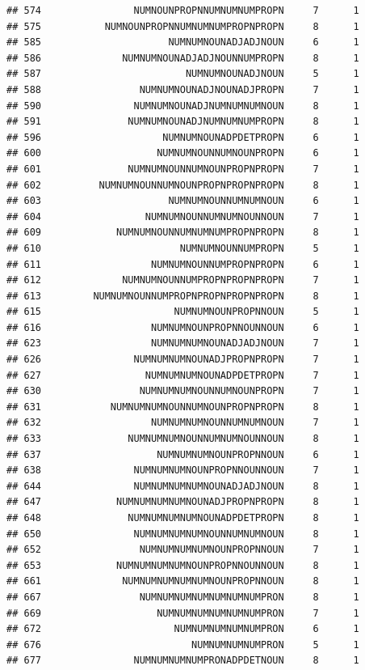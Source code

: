 \documentclass[]{article}
\begin{document}
\begin{verbatim}
## 574                NUMNOUNPROPNNUMNUMNUMPROPN     7      1
## 575           NUMNOUNPROPNNUMNUMNUMPROPNPROPN     8      1
## 585                      NUMNUMNOUNADJADJNOUN     6      1
## 586              NUMNUMNOUNADJADJNOUNNUMPROPN     8      1
## 587                         NUMNUMNOUNADJNOUN     5      1
## 588                 NUMNUMNOUNADJNOUNADJPROPN     7      1
## 590                NUMNUMNOUNADJNUMNUMNUMNOUN     8      1
## 591               NUMNUMNOUNADJNUMNUMNUMPROPN     8      1
## 596                     NUMNUMNOUNADPDETPROPN     6      1
## 600                    NUMNUMNOUNNUMNOUNPROPN     6      1
## 601               NUMNUMNOUNNUMNOUNPROPNPROPN     7      1
## 602          NUMNUMNOUNNUMNOUNPROPNPROPNPROPN     8      1
## 603                      NUMNUMNOUNNUMNUMNOUN     6      1
## 604                  NUMNUMNOUNNUMNUMNOUNNOUN     7      1
## 609             NUMNUMNOUNNUMNUMNUMPROPNPROPN     8      1
## 610                        NUMNUMNOUNNUMPROPN     5      1
## 611                   NUMNUMNOUNNUMPROPNPROPN     6      1
## 612              NUMNUMNOUNNUMPROPNPROPNPROPN     7      1
## 613         NUMNUMNOUNNUMPROPNPROPNPROPNPROPN     8      1
## 615                       NUMNUMNOUNPROPNNOUN     5      1
## 616                   NUMNUMNOUNPROPNNOUNNOUN     6      1
## 623                   NUMNUMNUMNOUNADJADJNOUN     7      1
## 626                NUMNUMNUMNOUNADJPROPNPROPN     7      1
## 627                  NUMNUMNUMNOUNADPDETPROPN     7      1
## 630                 NUMNUMNUMNOUNNUMNOUNPROPN     7      1
## 631            NUMNUMNUMNOUNNUMNOUNPROPNPROPN     8      1
## 632                   NUMNUMNUMNOUNNUMNUMNOUN     7      1
## 633               NUMNUMNUMNOUNNUMNUMNOUNNOUN     8      1
## 637                    NUMNUMNUMNOUNPROPNNOUN     6      1
## 638                NUMNUMNUMNOUNPROPNNOUNNOUN     7      1
## 644                NUMNUMNUMNUMNOUNADJADJNOUN     8      1
## 647             NUMNUMNUMNUMNOUNADJPROPNPROPN     8      1
## 648               NUMNUMNUMNUMNOUNADPDETPROPN     8      1
## 650                NUMNUMNUMNUMNOUNNUMNUMNOUN     8      1
## 652                 NUMNUMNUMNUMNOUNPROPNNOUN     7      1
## 653             NUMNUMNUMNUMNOUNPROPNNOUNNOUN     8      1
## 661              NUMNUMNUMNUMNUMNOUNPROPNNOUN     8      1
## 667                 NUMNUMNUMNUMNUMNUMNUMPRON     8      1
## 669                    NUMNUMNUMNUMNUMNUMPRON     7      1
## 672                       NUMNUMNUMNUMNUMPRON     6      1
## 676                          NUMNUMNUMNUMPRON     5      1
## 677                NUMNUMNUMNUMPRONADPDETNOUN     8      1

\end{verbatim}
\end{document}
